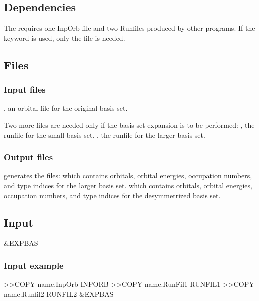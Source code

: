 \subsection{Dependencies}
\label{UG:sec:expbas_dependencies}
The  requires one InpOrb file and two Runfiles produced by other programs.
If the keyword  is used, only the  file is needed.

\subsection{Files}
\label{UG:sec:expbas_files}
\subsubsection{Input files}

, an orbital file for the original basis set.

Two more files are needed only if the basis set expansion is to be performed:
, the runfile for the small basis set.
, the runfile for the larger basis set.

\subsubsection{Output files}

 generates the files:
 which contains orbitals, orbital energies, occupation numbers, and
type indices for the larger basis set.
 which contains orbitals, orbital energies, occupation numbers, and
type indices for the desymmetrized basis set.


\subsection{Input}
\label{UG:sec:expbas_input}
\begin{inputlisting}
 &EXPBAS
\end{inputlisting}

\subsubsection{Input example}

\begin{inputlisting}
>>COPY name.InpOrb INPORB
>>COPY name.RunFil1 RUNFIL1
>>COPY name.Runfil2 RUNFIL2
 &EXPBAS
\end{inputlisting}

